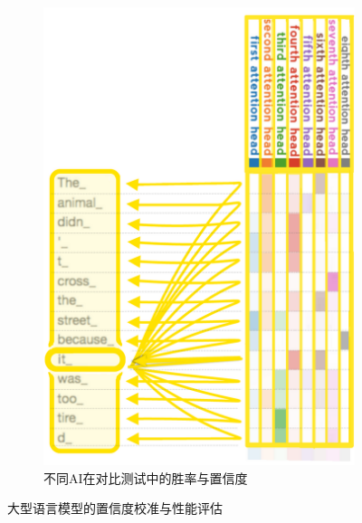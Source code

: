 \begin{figure}[htbp]
\begin{subfigure}[b]{0.48\textwidth}
        \includegraphics[width=\textwidth]{figures/LLM4.png}
        \caption{不同AI在对比测试中的胜率与置信度}
        \label{fig:llm_winrate_confidence}
    \end{subfigure}
    \caption{大型语言模型的置信度校准与性能评估}
    \label{fig:llm_confidence_calibration}
\end{figure}

